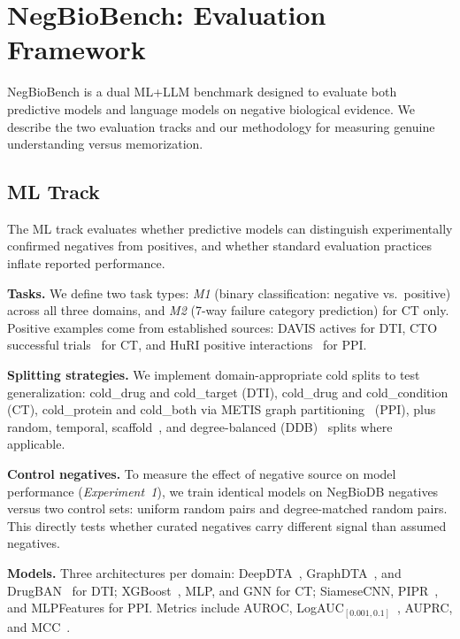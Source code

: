 \section{NegBioBench: Evaluation Framework}
\label{sec:benchmark}

NegBioBench is a dual ML+LLM benchmark designed to evaluate both predictive models and language models on negative biological evidence. We describe the two evaluation tracks and our methodology for measuring genuine understanding versus memorization.

\subsection{ML Track}

The ML track evaluates whether predictive models can distinguish experimentally confirmed negatives from positives, and whether standard evaluation practices inflate reported performance.

\textbf{Tasks.} We define two task types: \emph{M1} (binary classification: negative vs.\ positive) across all three domains, and \emph{M2} (7-way failure category prediction) for CT only. Positive examples come from established sources: DAVIS actives for DTI, CTO successful trials~\citep{siah2021cto} for CT, and HuRI positive interactions~\citep{luck2020huri} for PPI.

\textbf{Splitting strategies.} We implement domain-appropriate cold splits to test generalization: cold\_drug and cold\_target (DTI), cold\_drug and cold\_condition (CT), cold\_protein and cold\_both via METIS graph partitioning~\citep{karypis1998metis} (PPI), plus random, temporal, scaffold~\citep{bemis1996murcko}, and degree-balanced (DDB)~\citep{zheng2020ddb} splits where applicable.

\textbf{Control negatives.} To measure the effect of negative source on model performance (\emph{Experiment~1}), we train identical models on NegBioDB negatives versus two control sets: uniform random pairs and degree-matched random pairs. This directly tests whether curated negatives carry different signal than assumed negatives.

\textbf{Models.} Three architectures per domain: DeepDTA~\citep{ozturk2018deepdta}, GraphDTA~\citep{nguyen2021graphdta}, and DrugBAN~\citep{bai2023drugban} for DTI; XGBoost~\citep{chen2016xgboost}, MLP, and GNN for CT; SiameseCNN, PIPR~\citep{chen2019pipr}, and MLPFeatures for PPI. Metrics include AUROC, LogAUC$_{[0.001,0.1]}$~\citep{mysinger2010logauc}, AUPRC, and MCC~\citep{matthews1975mcc}.

